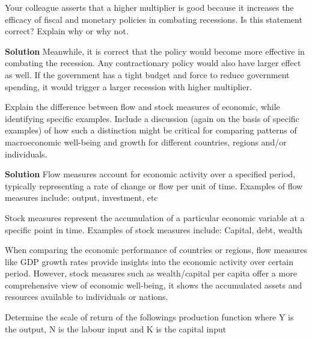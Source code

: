 \documentclass[addpoints,12pt,answers]{exam}
\begin{document}
	\vspace*{3em}
	
	
	\vspace*{3em}
	
	\begin{questions}
		
		
		\question   Your colleague asserts that a higher multiplier is good because it increases the efficacy of fiscal and monetary policies in combating recessions. Is this statement correct? Explain why or why not.
		
		
		\textbf{Solution}
		Meanwhile, it is correct that the policy would become more effective in combating the recession. Any contractionary policy would also have larger effect as well. If the government has a tight budget and force to reduce government spending, it would trigger a larger recession with higher multiplier.
		
		\question Explain the difference between flow and stock measures of economic, while identifying specific examples. Include a discussion (again on the basis of specific examples) of how such a distinction might be critical for comparing patterns of macroeconomic well-being and growth for different countries, regions and/or individuals.
		
		\textbf{Solution}
		Flow measures account for economic activity over a specified period, typically representing a rate of change or flow per unit of time. Examples of flow measures include: output, investment, etc
		
		Stock measures represent the accumulation of a particular economic variable at a specific point in time. Examples of stock measures include: Capital, debt, wealth
		
		When comparing the economic performance of countries or regions, flow measures like GDP growth rates provide insights into the economic activity over certain period. However, stock measures such as wealth/capital per capita offer a more comprehensive view of economic well-being, it shows the accumulated assets and resources available to individuals or nations.
		
		
		\question  Determine the scale of return of the followings production function where Y is the output, N is the labour input and K is the capital input
\end{questions}
\end{document}
